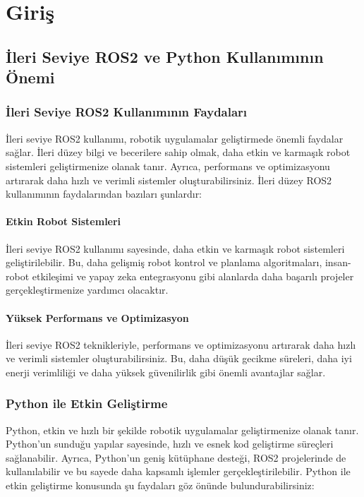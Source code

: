 \chapter{Giriş}

\section{İleri Seviye ROS2 ve Python Kullanımının Önemi}
\subsection{İleri Seviye ROS2 Kullanımının Faydaları}
İleri seviye ROS2 kullanımı, robotik uygulamalar geliştirmede önemli faydalar sağlar. İleri düzey bilgi ve becerilere sahip olmak, daha etkin ve karmaşık robot sistemleri geliştirmenize olanak tanır. Ayrıca, performans ve optimizasyonu artırarak daha hızlı ve verimli sistemler oluşturabilirsiniz. İleri düzey ROS2 kullanımının faydalarından bazıları şunlardır:

\subsubsection{Etkin Robot Sistemleri}
İleri seviye ROS2 kullanımı sayesinde, daha etkin ve karmaşık robot sistemleri geliştirilebilir. Bu, daha gelişmiş robot kontrol ve planlama algoritmaları, insan-robot etkileşimi ve yapay zeka entegrasyonu gibi alanlarda daha başarılı projeler gerçekleştirmenize yardımcı olacaktır.

\subsubsection{Yüksek Performans ve Optimizasyon}
İleri seviye ROS2 teknikleriyle, performans ve optimizasyonu artırarak daha hızlı ve verimli sistemler oluşturabilirsiniz. Bu, daha düşük gecikme süreleri, daha iyi enerji verimliliği ve daha yüksek güvenilirlik gibi önemli avantajlar sağlar.

\subsection{Python ile Etkin Geliştirme}
Python, etkin ve hızlı bir şekilde robotik uygulamalar geliştirmenize olanak tanır. Python'un sunduğu yapılar sayesinde, hızlı ve esnek kod geliştirme süreçleri sağlanabilir. Ayrıca, Python'un geniş kütüphane desteği, ROS2 projelerinde de kullanılabilir ve bu sayede daha kapsamlı işlemler gerçekleştirilebilir. Python ile etkin geliştirme konusunda şu faydaları göz önünde bulundurabilirsiniz:

